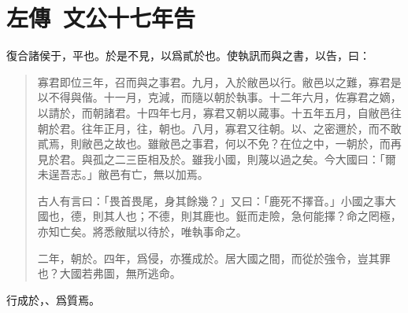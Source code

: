 \section[鄭子家告趙宣子\quad{\small 左傳 文公十七年}]{{\normalsize 左傳\ 文公十七年}\quad {}告}
復合諸侯于，平也。於是不見，以爲貳於也。使執訊而與之書，以告，曰：

\begin{quotation}寡君即位三年，召而與之事君。九月，入於敝邑以行。敝邑以之難，寡君是以不得與偕。十一月，克減，而隨以朝於執事。十二年六月，佐寡君之嫡，以請於，而朝諸君。十四年七月，寡君又朝以蕆事。十五年五月，自敝邑往朝於君。往年正月，往，朝也。八月，寡君又往朝。以、之密邇於，而不敢貳焉，則敝邑之故也。雖敝邑之事君，何以不免？在位之中，一朝於，而再見於君。與孤之二三臣相及於。雖我小國，則蔑以過之矣。今大國曰：「爾未逞吾志。」敝邑有亡，無以加焉。
    
古人有言曰：「畏首畏尾，身其餘幾？」又曰：「鹿死不擇音。」小國之事大國也，德，則其人也；不德，則其鹿也。鋌而走險，急何能擇？命之罔極，亦知亡矣。將悉敝賦以待於，唯執事命之。

二年，朝於。四年，爲侵，亦獲成於。居大國之間，而從於強令，豈其罪也？大國若弗圖，無所逃命。
\end{quotation}

行成於，、爲質焉。

\theendnotes

